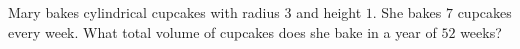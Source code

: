 Mary bakes cylindrical cupcakes with radius $3$ and height $1$. She bakes $7$ cupcakes every week. What total volume of cupcakes does she bake in a year of $52$ weeks?
